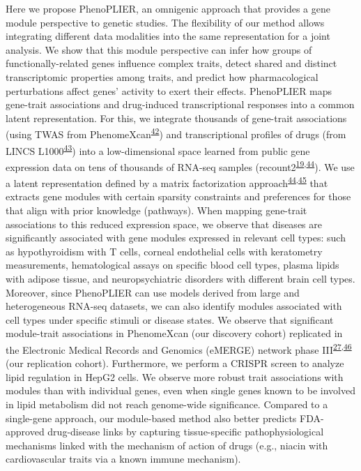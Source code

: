\documentclass[
  a4paper,
]{article}
\begin{document}
Here we propose PhenoPLIER, an omnigenic approach that provides a gene module perspective to genetic studies.
The flexibility of our method allows integrating different data modalities into the same representation for a joint analysis.
We show that this module perspective can infer how groups of functionally-related genes influence complex traits, detect shared and distinct transcriptomic properties among traits, and predict how pharmacological perturbations affect genes' activity to exert their effects.
PhenoPLIER maps gene-trait associations and drug-induced transcriptional responses into a common latent representation.
For this, we integrate thousands of gene-trait associations (using TWAS from PhenomeXcan\textsuperscript{\protect\hyperlink{ref-lY5ln3dB}{42}}) and transcriptional profiles of drugs (from LINCS L1000\textsuperscript{\protect\hyperlink{ref-F7lIlh2N}{43}}) into a low-dimensional space learned from public gene expression data on tens of thousands of RNA-seq samples (recount2\textsuperscript{\protect\hyperlink{ref-6SPTvFXq}{19},\protect\hyperlink{ref-14rnBunuZ}{44}}).
We use a latent representation defined by a matrix factorization approach\textsuperscript{\protect\hyperlink{ref-14rnBunuZ}{44},\protect\hyperlink{ref-Ki2ij7zE}{45}} that extracts gene modules with certain sparsity constraints and preferences for those that align with prior knowledge (pathways).
When mapping gene-trait associations to this reduced expression space, we observe that diseases are significantly associated with gene modules expressed in relevant cell types: such as hypothyroidism with T cells, corneal endothelial cells with keratometry measurements, hematological assays on specific blood cell types, plasma lipids with adipose tissue, and neuropsychiatric disorders with different brain cell types.
Moreover, since PhenoPLIER can use models derived from large and heterogeneous RNA-seq datasets, we can also identify modules associated with cell types under specific stimuli or disease states.
We observe that significant module-trait associations in PhenomeXcan (our discovery cohort) replicated in the Electronic Medical Records and Genomics (eMERGE) network phase III\textsuperscript{\protect\hyperlink{ref-gZAOkumx}{27},\protect\hyperlink{ref-wfqjCerX}{46}} (our replication cohort).
Furthermore, we perform a CRISPR screen to analyze lipid regulation in HepG2 cells.
We observe more robust trait associations with modules than with individual genes, even when single genes known to be involved in lipid metabolism did not reach genome-wide significance.
Compared to a single-gene approach, our module-based method also better predicts FDA-approved drug-disease links by capturing tissue-specific pathophysiological mechanisms linked with the mechanism of action of drugs (e.g., niacin with cardiovascular traits via a known immune mechanism).
\end{document}
